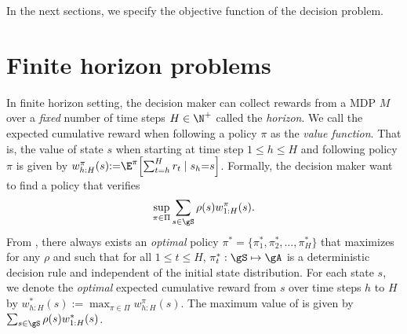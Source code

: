 In the next sections, we specify the objective function of the decision problem.


\section{Finite horizon problems}
\label{ch:mdp:sec:finite}


In finite horizon setting, the decision maker can collect rewards from a MDP $M$ over a \emph{fixed} number of time steps $H\in\N^+$ called the \emph{horizon}.
We call the expected cumulative reward when following a policy $\pi$ as the \emph{value function}.
That is, the value of state $s$ when starting at time step $1\le h\le H$ and following policy $\pi$ is given by $w_{h:H}^\pi(s){:=}\E^\pi\Bigl[\sum_{t=h}^H r_t\mid s_h{=}s\Bigr]$.
Formally, the decision maker want to find a policy that verifies
\begin{equation}
    \label{eq:finite_obj}
    \sup_{\pi\in\Pi}\sum_{s\in\gS}\rho(s)w_{1:H}^\pi(s).
\end{equation}
From \cite[Chapter~4]{puterman2014markov}, there always exists an \emph{optimal} policy $\pi^*=\{\pi_1^*,\pi_2^*,\dots,\pi^*_H\}$ that maximizes  for any $\rho$ and such that for all $1\le t\le H$, $\pi_t^*:\gS\mapsto\gA$ is a deterministic decision rule and independent of the initial state distribution.
For each state $s$, we denote the \emph{optimal} expected cumulative reward from $s$ over time steps $h$ to $H$ by $w_{h:H}^{*}(s){:=}\max_{\pi\in\Pi}w_{h:H}^\pi(s)$.
The maximum value of  is given by $\sum_{s\in\gS}\rho(s)w_{1:H}^*(s)$.

